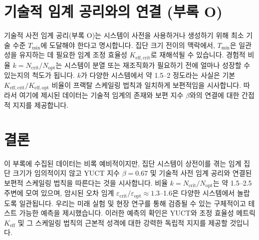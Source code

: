 \documentclass[12pt]{article}
\theoremstyle{remark}
\newcommand{\Keff}{K_{\mathrm{eff}}}
\newcommand{\Tmin}{T_{\min}}
\begin{document}
	\section{기술적 임계 공리와의 연결 (부록 O)}
	\label{sec:connection}
	
	기술적 사전 임계 공리(부록 O)는 시스템이 사전을 사용하거나 생성하기 위해 최소 기술 수준 \(\Tmin\)에 도달해야 한다고 명시합니다. 집단 크기 전이의 맥락에서, \(\Tmin\)은 일관성을 유지하는 데 필요한 임계 조정 효율성 \(K_{\mathrm{eff},\text{crit}}\)로 재해석될 수 있습니다. 경험적 비율 \(k = N_{\text{crit}}/N_{\text{opt}}\)는 시스템이 분열 또는 재조직화가 필요하기 전에 얼마나 성장할 수 있는지의 척도가 됩니다. \(k\)가 다양한 시스템에서 약 1.5–2 정도라는 사실은 기본 \(K_{\mathrm{eff},\text{crit}}/K_{\mathrm{eff},\text{opt}}\) 비율이 프랙탈 스케일링 법칙과 일치하게 보편적임을 시사합니다. 따라서 여기에 제시된 데이터는 기술적 임계의 존재와 보편 지수 \(\beta\)와의 연결에 대한 간접적 지지를 제공합니다.
	
	\section{결론}
	\label{sec:conclusion}
	
	이 부록에 수집된 데이터는 비록 예비적이지만, 집단 시스템이 상전이를 겪는 임계 집단 크기가 임의적이지 않고 YUCT 지수 \(\beta = 0.67\) 및 기술적 사전 임계 공리와 연결된 보편적 스케일링 법칙을 따른다는 것을 시사합니다. 비율 \(k = N_{\text{crit}}/N_{\text{opt}}\)는 약 1.5–2.5 주변에 모여 있으며, 암시된 오차 임계 \(\varepsilon_{\text{crit}}/\varepsilon_{\text{opt}} \approx 1.3\)–1.6은 다양한 시스템에서 놀랍도록 일관됩니다. 우리는 미래 실험 및 현장 연구를 통해 검증될 수 있는 구체적이고 테스트 가능한 예측을 제시했습니다. 이러한 예측의 확인은 YUCT와 조정 효율성 메트릭 \(\Keff\) 및 그 스케일링 법칙의 근본적 성격에 대한 강력한 독립적 지지를 제공할 것입니다.
	
\end{document}
